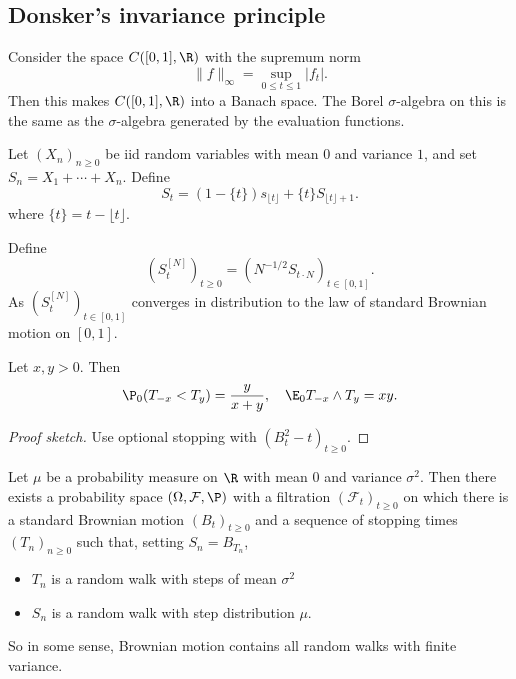 \documentclass[a4paper]{article}
\begin{document}
\subsection{Donsker's invariance principle}
Consider the space $C([0, 1], \R)$ with the supremum norm
\[
  \|f\|_\infty = \sup_{0 \leq t \leq 1} |f_t|.
\]
Then this makes $C([0, 1], \R)$ into a Banach space. The Borel $\sigma$-algebra on this is the same as the $\sigma$-algebra generated by the evaluation functions.

\begin{thm}
  Let $(X_n)_{n \geq 0}$ be iid random variables with mean $0$ and variance $1$, and set $S_n = X_1 + \cdots + X_n$. Define
  \[
    S_t = (1 - \{t\}) s_{\lfloor t \rfloor} + \{t\} S_{\lfloor t \rfloor + 1}.
  \]
  where $\{t\} = t - \lfloor t \rfloor$.

  Define
  \[
    (S_t^{[N]})_{t \geq 0} = (N^{-1/2} S_{t \cdot N})_{t \in [0, 1]}.
  \]
  As $(S_t^{[N]})_{t \in [0, 1]}$ converges in distribution to the law of standard Brownian motion on $[0, 1]$.
\end{thm}

\begin{lemma}
  Let $x, y > 0$. Then
  \[
    \P_0(T_{-x} < T_y) = \frac{y}{x + y},\quad \E_0 T_{-x} \wedge T_y = xy.
  \]
\end{lemma}

\begin{proof}[Proof sketch]
  Use optional stopping with $(B_t^2 - t)_{t \geq 0}$.
\end{proof}

\begin{thm}
  Let $\mu$ be a probability measure on $\R$ with mean $0$ and variance $\sigma^2$. Then there exists a probability space $(\Omega, \mathcal{F}, \P)$ with a filtration $(\mathcal{F}_t)_{t \geq 0}$ on which there is a standard Brownian motion $(B_t)_{t \geq 0}$ and a sequence of stopping times $(T_n)_{n \geq 0}$ such that, setting $S_n = B_{T_n}$,
  \begin{itemize}
    \item $T_n$ is a random walk with steps of mean $\sigma^2$
    \item $S_n$ is a random walk with step distribution $\mu$.
  \end{itemize}
\end{thm}
So in some sense, Brownian motion contains all random walks with finite variance.
\end{document}
